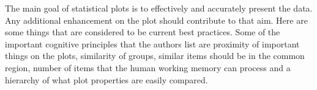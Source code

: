 \documentclass[fleqn,moreauthors,10pt]{ds_report}
\begin{document}
The main goal of statistical plots is to effectively and accurately present the data. Any additional enhancement on the plot should contribute to that aim. Here are some things that are considered to be current best practices.
Some of the important cognitive principles that the authors list are proximity of important things on the plots, similarity of groups, similar items should be in the common region, number of items that the human working memory can process and a hierarchy of what plot properties are easily compared.
\end{document}
